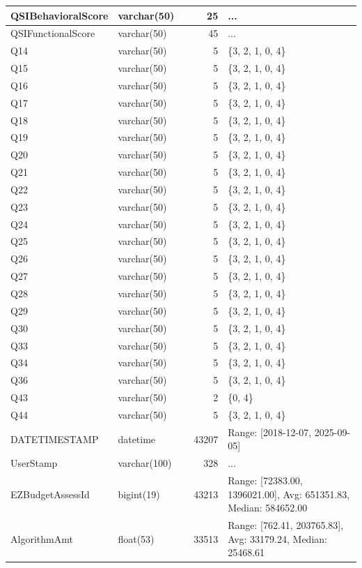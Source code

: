 \begin{landscape}
\begin{longtable}{|l|l|l|r|p{6cm}|}
\hline
QSIBehavioralScore & varchar(50) &  & 25 & ... \\
\hline
QSIFunctionalScore & varchar(50) &  & 45 & ... \\
\hline
Q14 & varchar(50) &  & 5 & \{3, 2, 1, 0, 4\} \\
\hline
Q15 & varchar(50) &  & 5 & \{3, 2, 1, 0, 4\} \\
\hline
Q16 & varchar(50) &  & 5 & \{3, 2, 1, 0, 4\} \\
\hline
Q17 & varchar(50) &  & 5 & \{3, 2, 1, 0, 4\} \\
\hline
Q18 & varchar(50) &  & 5 & \{3, 2, 1, 0, 4\} \\
\hline
Q19 & varchar(50) &  & 5 & \{3, 2, 1, 0, 4\} \\
\hline
Q20 & varchar(50) &  & 5 & \{3, 2, 1, 0, 4\} \\
\hline
Q21 & varchar(50) &  & 5 & \{3, 2, 1, 0, 4\} \\
\hline
Q22 & varchar(50) &  & 5 & \{3, 2, 1, 0, 4\} \\
\hline
Q23 & varchar(50) &  & 5 & \{3, 2, 1, 0, 4\} \\
\hline
Q24 & varchar(50) &  & 5 & \{3, 2, 1, 0, 4\} \\
\hline
Q25 & varchar(50) &  & 5 & \{3, 2, 1, 0, 4\} \\
\hline
Q26 & varchar(50) &  & 5 & \{3, 2, 1, 0, 4\} \\
\hline
Q27 & varchar(50) &  & 5 & \{3, 2, 1, 0, 4\} \\
\hline
Q28 & varchar(50) &  & 5 & \{3, 2, 1, 0, 4\} \\
\hline
Q29 & varchar(50) &  & 5 & \{3, 2, 1, 0, 4\} \\
\hline
Q30 & varchar(50) &  & 5 & \{3, 2, 1, 0, 4\} \\
\hline
Q33 & varchar(50) &  & 5 & \{3, 2, 1, 0, 4\} \\
\hline
Q34 & varchar(50) &  & 5 & \{3, 2, 1, 0, 4\} \\
\hline
Q36 & varchar(50) &  & 5 & \{3, 2, 1, 0, 4\} \\
\hline
Q43 & varchar(50) &  & 2 & \{0, 4\} \\
\hline
Q44 & varchar(50) &  & 5 & \{3, 2, 1, 0, 4\} \\
\hline
DATETIMESTAMP & datetime &  & 43207 & Range: [2018-12-07, 2025-09-05] \\
\hline
UserStamp & varchar(100) &  & 328 & ... \\
\hline
EZBudgetAssessId & bigint(19) &  & 43213 & Range: [72383.00, 1396021.00], Avg: 651351.83, Median: 584652.00 \\
\hline
AlgorithmAmt & float(53) &  & 33513 & Range: [762.41, 203765.83], Avg: 33179.24, Median: 25468.61 \\
\hline
\end{longtable}


\end{landscape}
